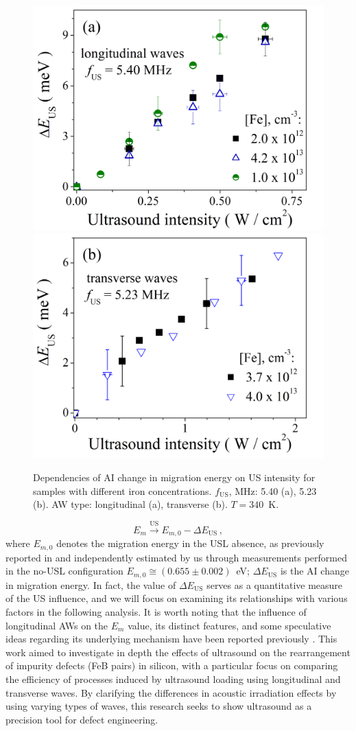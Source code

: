 \documentclass{ttp}
\begin{document}
\begin{figure}
	\centering
     \includegraphics[width=0.4\linewidth]{Fig2a.png}
     \includegraphics[width=0.4\linewidth]{Fig2b.png}
	  \caption{Dependencies of AI change in migration energy on US intensity for
       samples with different  iron concentrations.
       $f_\mathrm{US}$, MHz: 5.40 (a), 5.23 (b).
       AW type: longitudinal (a), transverse (b).
       $T=340$~K.
}\label{fig2}
\end{figure}

\begin{equation}
\label{eqEmUs}
E_m \xrightarrow{\mathrm{US}} E_{m,0}-\Delta E_\mathrm{US}\,,
\end{equation}
where
$E_{m,0}$ denotes the migration energy in the USL absence,
as previously reported in \cite{FeBAssJAP2014}
and independently estimated by us through measurements performed in the no-USL configuration
$E_{m,0}\cong(0.655\pm0.002)$~eV;
$\Delta E_\mathrm{US}$ is the AI change in migration energy.
In fact, the value of $\Delta E_\mathrm{US}$ serves as a quantitative measure
of the US influence, and we will focus on examining its relationships with various factors in the following analysis.
It is worth noting that the influence of longitudinal AWs on the $E_m$ value,
its distinct features, and some speculative ideas regarding its underlying mechanism have been reported previously \cite{Olikh2021JAP,Olikh2022:JMatSci}.
This work aimed to investigate in depth the effects of ultrasound on the rearrangement of impurity defects
(FeB pairs) in silicon, with a particular focus on comparing the efficiency of processes induced by ultrasound loading
using longitudinal and transverse waves.
By clarifying the differences in acoustic irradiation effects by using varying types of waves,
this research seeks to show ultrasound as a precision tool for defect engineering.
\end{document}
